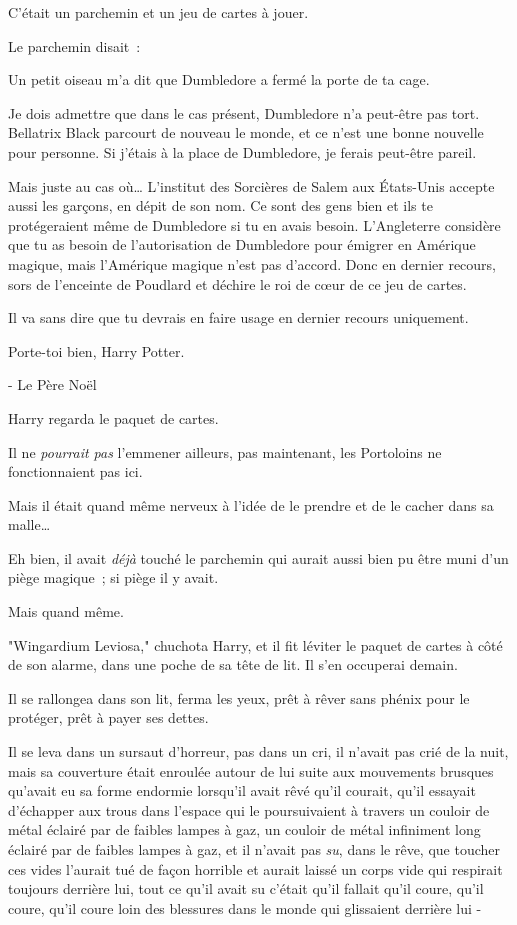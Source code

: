 C'était un parchemin et un jeu de cartes à jouer.

Le parchemin disait~:

\begin{writtenNote}
Un petit oiseau m'a dit que Dumbledore a fermé la porte de ta cage.

Je dois admettre que dans le cas présent, Dumbledore n'a peut-être pas tort. Bellatrix Black parcourt de nouveau le monde, et ce n'est une bonne nouvelle pour personne. Si j'étais à la place de Dumbledore, je ferais peut-être pareil.

Mais juste au cas où… L'institut des Sorcières de Salem aux États-Unis accepte aussi les garçons, en dépit de son nom. Ce sont des gens bien et ils te protégeraient même de Dumbledore si tu en avais besoin. L'Angleterre considère que tu as besoin de l'autorisation de Dumbledore pour émigrer en Amérique magique, mais l'Amérique magique n'est pas d'accord. Donc en dernier recours, sors de l'enceinte de Poudlard et déchire le roi de cœur de ce jeu de cartes.

Il va sans dire que tu devrais en faire usage en dernier recours uniquement.

Porte-toi bien, Harry Potter.

- Le Père Noël
\end{writtenNote}

Harry regarda le paquet de cartes.

Il ne \emph{pourrait pas} l'emmener ailleurs, pas maintenant, les Portoloins ne fonctionnaient pas ici.

Mais il était quand même nerveux à l'idée de le prendre et de le cacher dans sa malle…

Eh bien, il avait \emph{déjà} touché le parchemin qui aurait aussi bien pu être muni d'un piège magique~; si piège il y avait.

Mais quand même.

"Wingardium Leviosa," chuchota Harry, et il fit léviter le paquet de cartes à côté de son alarme, dans une poche de sa tête de lit. Il s'en occuperai demain.

Il se rallongea dans son lit, ferma les yeux, prêt à rêver sans phénix pour le protéger, prêt à payer ses dettes.

\later

Il se leva dans un sursaut d'horreur, pas dans un cri, il n'avait pas crié de la nuit, mais sa couverture était enroulée autour de lui suite aux mouvements brusques qu'avait eu sa forme endormie lorsqu'il avait rêvé qu'il courait, qu'il essayait d'échapper aux trous dans l'espace qui le poursuivaient à travers un couloir de métal éclairé par de faibles lampes à gaz, un couloir de métal infiniment long éclairé par de faibles lampes à gaz, et il n'avait pas \emph{su}, dans le rêve, que toucher ces vides l'aurait tué de façon horrible et aurait laissé un corps vide qui respirait toujours derrière lui, tout ce qu'il avait su c'était qu'il fallait qu'il coure, qu'il coure, qu'il coure loin des blessures dans le monde qui glissaient derrière lui -

